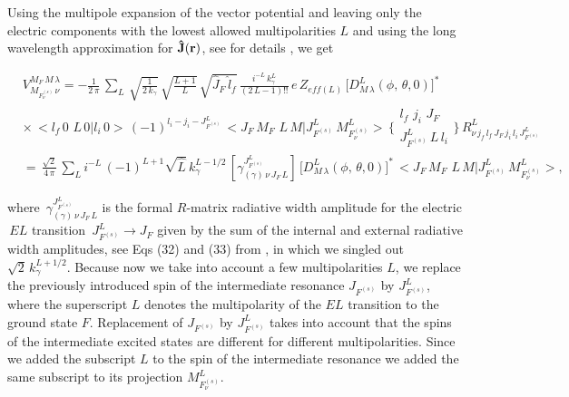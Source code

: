 \documentclass[prl,unsortedaddress,groupedaddress,twocolumn,amsmath,amsfonts,amssymb,showpacs,floatfix,nofootinbib]{revtex4}
\begin{document}
Using the multipole expansion of  the vector potential and leaving only
the electric components with the lowest allowed multipolarities $L$ and using the long wavelength approximation for ${\rm {\bf {\hat J}}}({\rm {\bf r}}) $, see for details \cite{muk2016},  we get
\begin{widetext}
\begin{align}
& V_{M_{F_{\nu}^{(s)}}\,\nu}^{M_{F}\,M\,\lambda}  = -\frac{1}{2\,\pi}\,\sum\limits_{L}\,\sqrt{ \frac{1}{2\,k_{\gamma}}} \,\sqrt{\frac{L+1}{L}}\,\sqrt{{\hat J}_{F}\,{\hat l}_{f}}\,\frac{i^{-L}\,k_{\gamma}^{L}}{(2\,L-1)!!}\,e\,Z_{eff{(L)}}\,\big[D^{L}_{M\,\lambda}(\phi,\,\theta,0)\big]^{*}\,   \nonumber\\
& \times\,<l_{f}\,0\,\,L\,0\big|l_{i}\,0>\,(-1)^{l_{i} - j_{i} -J_{F^{(s)}}^{L} }\,<J_{F}\,M_{F}\,\,L\,M \big|J_{F^{(s)}}^{L}\,M_{F_{\nu}^{(s)}}^{L}>\,\Bigg\lbrace \begin{array}{ccc} l_{f} \,\,j_{i}\,\,J_{F} \\
 J_{F^{(s)}}^{L}\,L\,l_{i}  \end{array} \Bigg\rbrace\,R_{\nu\,j_{f}\,l_{f}\,J_{F}\,j_{i}\,l_{i}\,J_{F^{(s)}}^{L}}^{L}   \nonumber\\
&= \,\frac{\sqrt{2}}{4\,\pi}\,\sum\limits_{L}i^{-L}\,(-1)^{L+1}\sqrt{\hat L} \,k_{\gamma}^{L-1/2} \,[\gamma_{(\gamma)\,\nu\,J_{F}\,L}^{J_{F^{(s)}}^{L}} ]\, \big[D^{L}_{M\,\lambda}(\phi,\,\theta,0)\big]^{*}\,<J_{F}\,M_{F}\,\,L\,M \big|J_{F^{(s)}}^{L}\,M_{F_{\nu}^{(s)}}^{L}>,
 \label{VMFgamma2}
\end{align}
\end{widetext}
where $\,\gamma_{(\gamma)\,\nu\,J_{F}\,L}^{J_{F^{(s)}}^{L}}$ is the formal $R$-matrix radiative width amplitude for the electric  $\,EL$ transition $\,J_{F^{(s)}}^{L} \to J_{F}$  given by the sum of the internal and external radiative width amplitudes, see Eqs (32) and (33) from \cite{muk2017},  in  which we singled out $\sqrt{2}\,k_{\gamma}^{L+1/2}$. Because now we take into account a few multipolarities $L$, we replace the previously introduced spin of the intermediate resonance $J_{F^{(s)}}$ by $J_{F^{(s)}}^{L}$, where the superscript $L$ denotes the multipolarity of the $EL$ transition to the ground state $F$. Replacement of $J_{F^{(s)}}$ by $J_{F^{(s)}}^{L}$ takes into account that the spins of the intermediate excited states are different for different multipolarities. Since we added the subscript $L$ to the spin of the intermediate resonance we added the same subscript to its projection $M_{F_{\nu}^{(s)}}^{L}$.
\end{document}
